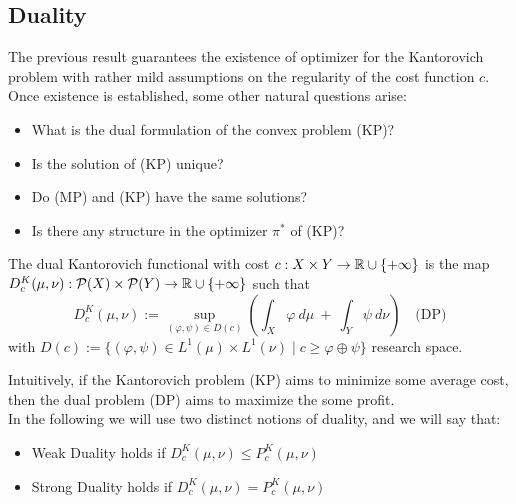 \documentclass[../main.tex]{subfiles}
\begin{document}
\subsection{Duality}
The previous result guarantees the existence of optimizer for the Kantorovich problem with rather mild assumptions on the regularity of the cost function $c$. Once existence is established, some other natural questions arise:
\begin{itemize}
    \item What is the dual formulation of the convex problem (KP)?
    \item Is the solution of (KP) unique?
    \item Do (MP) and (KP) have the same solutions?
    \item Is there any structure in the optimizer $\pi^*$ of (KP)?
\end{itemize}

\begin{definition}
    The dual Kantorovich functional with cost $c:X\times Y\to\mathbb{R}\cup\{+\infty\}$ is the map $D^K_c(\mu, \nu): \mathcal{P}(X)\times\mathcal{P}(Y)\to\mathbb{R}\cup\{+\infty\}$ such that
    $$
    D^K_c(\mu, \nu) := \sup_{(\varphi, \psi)\in D(c)} \left(\int_X \varphi \ d\mu \ + \ \int_Y \psi \ d\nu \right) 
    \quad \text{(DP)}
    $$
    with $D(c) := \{(\varphi, \psi)\in L^1(\mu)\times L^1(\nu) \mid  c \geq \varphi \oplus \psi\}$ research space.
\end{definition}

Intuitively, if the Kantorovich problem (KP) aims to minimize some average cost, then the dual problem (DP) aims to maximize the some profit.\\
In the following we will use two distinct notions of duality, and we will say that:
\begin{itemize}
    \item Weak Duality holds if $D^K_c(\mu, \nu) \leq P^K_c(\mu, \nu)$
    \item Strong Duality holds if $D^K_c(\mu, \nu) = P^K_c(\mu, \nu)$
\end{itemize}
\end{document}
